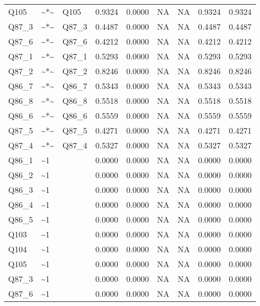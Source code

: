 \begin{longtable}{lllrrrrrr}
Q105 & \textasciitilde{}*\textasciitilde{} & Q105 & 0.9324 & 0.0000 & NA & NA & 0.9324 & 0.9324\\
Q87\_3 & \textasciitilde{}*\textasciitilde{} & Q87\_3 & 0.4487 & 0.0000 & NA & NA & 0.4487 & 0.4487\\
Q87\_6 & \textasciitilde{}*\textasciitilde{} & Q87\_6 & 0.4212 & 0.0000 & NA & NA & 0.4212 & 0.4212\\
\addlinespace
Q87\_1 & \textasciitilde{}*\textasciitilde{} & Q87\_1 & 0.5293 & 0.0000 & NA & NA & 0.5293 & 0.5293\\
Q87\_2 & \textasciitilde{}*\textasciitilde{} & Q87\_2 & 0.8246 & 0.0000 & NA & NA & 0.8246 & 0.8246\\
Q86\_7 & \textasciitilde{}*\textasciitilde{} & Q86\_7 & 0.5343 & 0.0000 & NA & NA & 0.5343 & 0.5343\\
Q86\_8 & \textasciitilde{}*\textasciitilde{} & Q86\_8 & 0.5518 & 0.0000 & NA & NA & 0.5518 & 0.5518\\
Q86\_6 & \textasciitilde{}*\textasciitilde{} & Q86\_6 & 0.5559 & 0.0000 & NA & NA & 0.5559 & 0.5559\\
\addlinespace
Q87\_5 & \textasciitilde{}*\textasciitilde{} & Q87\_5 & 0.4271 & 0.0000 & NA & NA & 0.4271 & 0.4271\\
Q87\_4 & \textasciitilde{}*\textasciitilde{} & Q87\_4 & 0.5327 & 0.0000 & NA & NA & 0.5327 & 0.5327\\
Q86\_1 & \textasciitilde{}1 &  & 0.0000 & 0.0000 & NA & NA & 0.0000 & 0.0000\\
Q86\_2 & \textasciitilde{}1 &  & 0.0000 & 0.0000 & NA & NA & 0.0000 & 0.0000\\
Q86\_3 & \textasciitilde{}1 &  & 0.0000 & 0.0000 & NA & NA & 0.0000 & 0.0000\\
\addlinespace
Q86\_4 & \textasciitilde{}1 &  & 0.0000 & 0.0000 & NA & NA & 0.0000 & 0.0000\\
Q86\_5 & \textasciitilde{}1 &  & 0.0000 & 0.0000 & NA & NA & 0.0000 & 0.0000\\
Q103 & \textasciitilde{}1 &  & 0.0000 & 0.0000 & NA & NA & 0.0000 & 0.0000\\
Q104 & \textasciitilde{}1 &  & 0.0000 & 0.0000 & NA & NA & 0.0000 & 0.0000\\
Q105 & \textasciitilde{}1 &  & 0.0000 & 0.0000 & NA & NA & 0.0000 & 0.0000\\
\addlinespace
Q87\_3 & \textasciitilde{}1 &  & 0.0000 & 0.0000 & NA & NA & 0.0000 & 0.0000\\
Q87\_6 & \textasciitilde{}1 &  & 0.0000 & 0.0000 & NA & NA & 0.0000 & 0.0000\\

\end{longtable}
